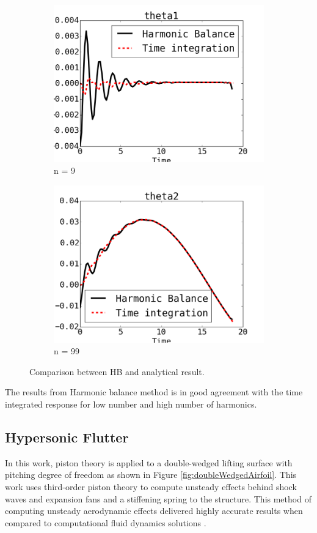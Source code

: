 \documentclass[12pt, a4paper]{extarticle}
\begin{document}
\begin{figure}[H]
	\centering
	\begin{subfigure}[h]{8.0 cm}
		\includegraphics[width=8.0 cm]{figure/P21.png}
		\caption{n = 9}
	\end{subfigure}
	\begin{subfigure}[h]{8.0 cm}
        \includegraphics[width=8.0 cm]{figure/P22.png}
		\caption{n = 99}
    \end{subfigure}
    \caption{Comparison between HB and analytical result.}
    \label{fig:Res1}
\end{figure}

The results from Harmonic balance method is in good agreement with the time integrated response for low number and high number of harmonics. 


\subsection{Hypersonic Flutter}
In this work, piston theory \cite{ashley2012piston} is applied to a double-wedged lifting surface with pitching degree of freedom as shown in Figure \ref{fig:doubleWedgedAirfoil}. This work uses third-order piston theory to compute unsteady effects behind shock waves and expansion fans and a stiffening spring to the structure. This method of computing unsteady aerodynamic effects delivered highly accurate results when compared to computational fluid dynamics solutions \cite{mcnamara2011aeroelastic}.
\end{document}
